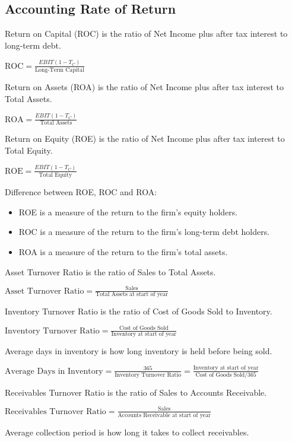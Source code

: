 \subsection{Accounting Rate of Return}

Return on Capital (ROC) is the ratio of Net Income plus after tax interest to long-term debt.

$\text{ROC} = \frac{EBIT\left(1-T_C\right)}{\text{Long-Term Capital}}$

Return on Assets (ROA) is the ratio of Net Income plus after tax interest to Total Assets.

$\text{ROA} = \frac{EBIT\left(1-T_C\right)}{\text{Total Assets}}$

Return on Equity (ROE) is the ratio of Net Income plus after tax interest to Total Equity.

$\text{ROE} = \frac{EBIT\left(1-T_C\right)}{\text{Total Equity}}$

Difference between ROE, ROC and ROA:
\begin{itemize}
    \item ROE is a measure of the return to the firm's equity holders.
    \item ROC is a measure of the return to the firm's long-term debt holders.
    \item ROA is a measure of the return to the firm's total assets.
\end{itemize}

Asset Turnover Ratio is the ratio of Sales to Total Assets.

$\text{Asset Turnover Ratio} = \frac{\text{Sales}}{\text{Total Assets at start of year}}$

Inventory Turnover Ratio is the ratio of Cost of Goods Sold to Inventory.

$\text{Inventory Turnover Ratio} = \frac{\text{Cost of Goods Sold}}{\text{Inventory at start of year}}$

Average days in inventory is how long inventory is held before being sold.

$\text{Average Days in Inventory} = \frac{365}{\text{Inventory Turnover Ratio}} = \frac{\text{Inventory at start of year}}{\text{Cost of Goods Sold}/ 365}$

Receivables Turnover Ratio is the ratio of Sales to Accounts Receivable.

$\text{Receivables Turnover Ratio} = \frac{\text{Sales}}{\text{Accounts Receivable at start of year}}$

Average collection period is how long it takes to collect receivables.

